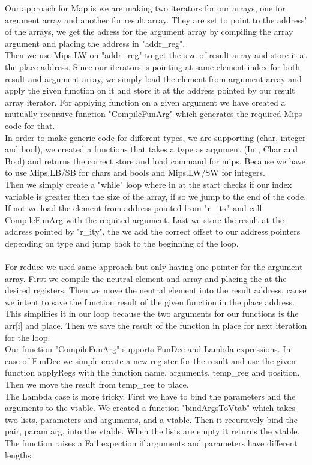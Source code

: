 \documentclass[12pt]{article}
\numberwithin{listing}{section}
\begin{document}
Our approach for Map is we are making two iterators for our arrays, one for argument array and another for result array. They are set to point to the address' of the arrays, we get the adress for the argument array by compiling the array argument and placing the address in "addr\_reg".
\\
Then we use Mips.LW on "addr\_reg" to get the size of result array and store it at the place address. Since our iterators is pointing at same element index for both result and argument array, we simply load the element from argument array and apply the given function on it and store it at the address pointed by our result array iterator. For applying function on a given argument we have created a mutually recursive function "CompileFunArg" which generates the required Mips code for that.\\
In order to make generic code for different types, we are supporting (char, integer and bool), we created a functions that takes a type as argument (Int, Char and Bool) and returns the correct store and load command for mips. Because we have to use Mips.LB/SB for chars and bools and Mips.LW/SW for integers.\\
Then we simply create a "while" loop where in at the start checks if our index variable is greater then the size of the array, if so we jump to the end of the code. If not we load the element from address pointed from "r\_itx" and call CompileFunArg with the requited argument. Last we store the result at the address pointed by "r\_ity", the we add the correct offset to our address pointers depending on type and jump back to the beginning of the loop. \\ \\
For reduce we used same approach but only having one pointer for the argument array. First we compile the neutral element and array and placing the at the desired registers. Then we move the neutral element into the result address, cause we intent to save the function result of the given function in the place address. This simplifies it in our loop because the two arguments for our functions is the arr[i] and place. Then we save the result of the function in place for next iteration for the loop.\\
Our function "CompileFunArg" supports FunDec and Lambda expressions. In case of FunDec we simple create a new register for the result and use the given function applyRegs with the function name, arguments, temp\_reg and position. Then we move the result from temp\_reg to place.\\
The Lambda case is more tricky. First we have to bind the parameters and the arguments to the vtable. We created a function "bindArgsToVtab" which takes two lists, parameters and arguments, and a vtable. Then it recursively bind the pair, param arg, into the vtable. When the lists are empty it returns the vtable. The function raises a Fail expection if arguments and parameters have different lengths.
\end{document}
